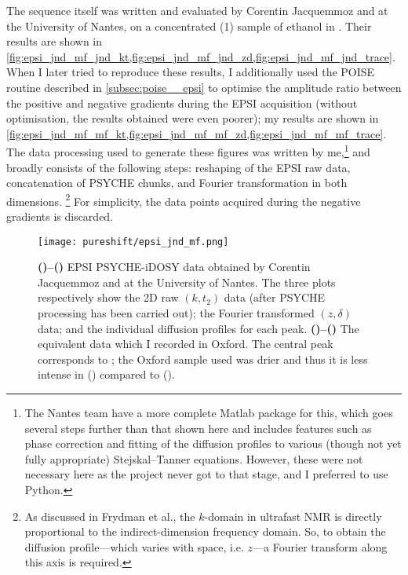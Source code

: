 The sequence itself was written and evaluated by Corentin Jacquemmoz and \JND{} at the University of Nantes, on a concentrated (\qty{1}{\molar}) sample of ethanol in .
Their results are shown in \cref{fig:epsi_jnd_mf_jnd_kt,fig:epsi_jnd_mf_jnd_zd,fig:epsi_jnd_mf_jnd_trace}.
When I later tried to reproduce these results, I additionally used the POISE routine described in \cref{subsec:poise__epsi} to optimise the amplitude ratio between the positive and negative gradients during the EPSI acquisition (without optimisation, the results obtained were even poorer); my results are shown in \cref{fig:epsi_jnd_mf_mf_kt,fig:epsi_jnd_mf_mf_zd,fig:epsi_jnd_mf_mf_trace}.
The data processing used to generate these figures was written by me,\footnote{The Nantes team have a more complete Matlab package for this, which goes several steps further than that shown here and includes features such as phase correction and fitting of the diffusion profiles to various (though not yet fully appropriate) Stejskal--Tanner equations. However, these were not necessary here as the project never got to that stage, and I preferred to use Python.} and broadly consists of the following steps: reshaping of the EPSI raw data, concatenation of PSYCHE chunks, and Fourier transformation in both dimensions.%
\footnote{As discussed in Frydman et al.\autocite{Frydman2003JACS}, the $k$-domain in ultrafast NMR is directly proportional to the indirect-dimension frequency domain. So, to obtain the diffusion profile---which varies with space, i.e. $z$---a Fourier transform along this axis is required.}
For simplicity, the data points acquired during the negative gradients is discarded.

\begin{figure}[htbp]
    \centering
    \texttt{[image: pureshift/epsi\_jnd\_mf.png]}%
    {\label{fig:epsi_jnd_mf_jnd_kt}}%
    {\label{fig:epsi_jnd_mf_jnd_zd}}%
    {\label{fig:epsi_jnd_mf_jnd_trace}}%
    {\label{fig:epsi_jnd_mf_mf_kt}}%
    {\label{fig:epsi_jnd_mf_mf_zd}}%
    {\label{fig:epsi_jnd_mf_mf_trace}}%
    \caption[Comparison of EPSI PSYCHE-iDOSY data acquired in Nantes and Oxford]{
        \textbf{()--()} EPSI PSYCHE-iDOSY data obtained by Corentin Jacquemmoz and \JND{} at the University of Nantes.
        The three plots respectively show the 2D raw $(k, t_2)$ data (after PSYCHE processing has been carried out); the Fourier transformed $(z, \delta)$ data; and the individual diffusion profiles for each peak.
        \textbf{()--()} The equivalent data which I recorded in Oxford.
        The central peak corresponds to ; the Oxford sample used was drier and thus it is less intense in () compared to ().
    }
    \label{fig:epsi_jnd_mf}
\end{figure}

